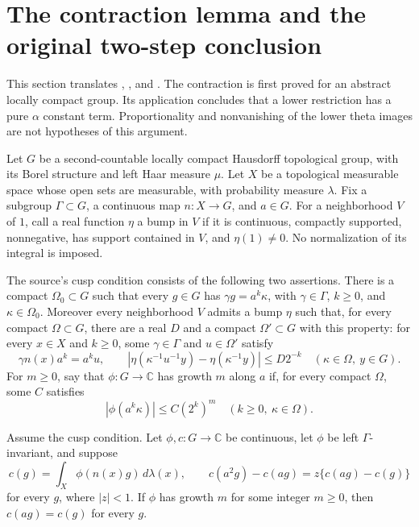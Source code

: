 
\section{The contraction lemma and the original two-step conclusion}
\label{sec:sr-source-two-step}

This section translates
,
, and .
The contraction is first proved for an abstract locally compact group.
Its application concludes that a lower restriction has a pure
\(\alpha\) constant term. Proportionality and nonvanishing of the
lower theta images are not hypotheses of this argument.

Let \(G\) be a second-countable locally compact Hausdorff topological
group, with its Borel structure and left Haar measure \(\mu\).
Let \(X\) be a topological measurable space whose open sets are
measurable, with probability measure \(\lambda\).
Fix a subgroup \(\Gamma\subset G\), a continuous map
\(n:X\to G\), and \(a\in G\).
For a neighborhood \(V\) of \(1\), call a real function \(\eta\)
a bump in \(V\) if it is continuous, compactly supported,
nonnegative, has support contained in \(V\), and \(\eta(1)\ne0\).
No normalization of its integral is imposed.

The source's cusp condition consists of the following two assertions.
There is a compact \(\Omega_0\subset G\) such that every \(g\in G\)
has \(\gamma g=a^k\kappa\), with \(\gamma\in\Gamma\),
\(k\ge0\), and \(\kappa\in\Omega_0\).
Moreover every neighborhood \(V\) admits a bump \(\eta\) such that,
for every compact \(\Omega\subset G\), there are a real \(D\)
and a compact \(\Omega'\subset G\) with this property:
for every \(x\in X\) and \(k\ge0\), some \(\gamma\in\Gamma\)
and \(u\in\Omega'\) satisfy
\[
 \gamma n(x)a^k=a^ku,\qquad
 |\eta(\kappa^{-1}u^{-1}y)-\eta(\kappa^{-1}y)|
                   \le D2^{-k}
 \quad(\kappa\in\Omega,\ y\in G).                 \tag{S1}
 \label{eq:sr-source-bump-cusp}
\]
For \(m\ge0\), say that \(\phi:G\to\mathbb C\) has growth
\(m\) along \(a\) if, for every compact \(\Omega\), some \(C\)
satisfies
\[
       |\phi(a^k\kappa)|\le C(2^k)^m
                 \quad(k\ge0,\ \kappa\in\Omega). \tag{S2}
 \label{eq:sr-source-growth-along-a}
\]

\begin{srlemma}
\label{lem:sr-source-abstract-contraction}
Assume the cusp condition. Let \(\phi,c:G\to\mathbb C\)
be continuous, let \(\phi\) be left \(\Gamma\)-invariant,
and suppose
\[
 c(g)=\int_X\phi(n(x)g)\,d\lambda(x),\qquad
 c(a^2g)-c(ag)=z\{c(ag)-c(g)\}                   \tag{S3}
 \label{eq:sr-source-contraction-data}
\]
for every \(g\), where \(|z|<1\).
If \(\phi\) has growth \(m\) for some integer \(m\ge0\),
then \(c(ag)=c(g)\) for every \(g\).
\end{srlemma}

